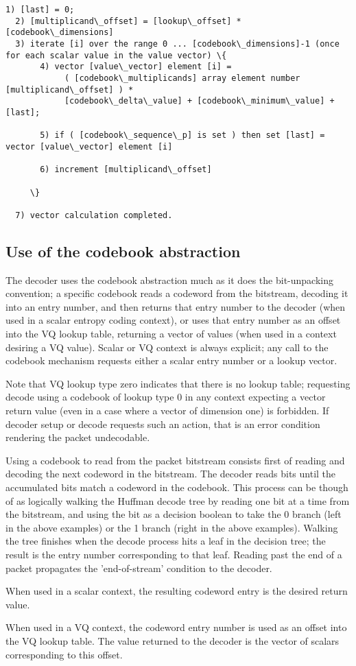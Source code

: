 \begin{Verbatim}[commandchars=\\\{\}]
  1) [last] = 0;
  2) [multiplicand\_offset] = [lookup\_offset] * [codebook\_dimensions]
  3) iterate [i] over the range 0 ... [codebook\_dimensions]-1 (once for each scalar value in the value vector) \{
       4) vector [value\_vector] element [i] =
            ( [codebook\_multiplicands] array element number [multiplicand\_offset] ) *
            [codebook\_delta\_value] + [codebook\_minimum\_value] + [last];

       5) if ( [codebook\_sequence\_p] is set ) then set [last] = vector [value\_vector] element [i]

       6) increment [multiplicand\_offset]

     \}

  7) vector calculation completed.
\end{Verbatim}









\subsection{Use of the codebook abstraction}

The decoder uses the codebook abstraction much as it does the
bit-unpacking convention; a specific codebook reads a
codeword from the bitstream, decoding it into an entry number, and then
returns that entry number to the decoder (when used in a scalar
entropy coding context), or uses that entry number as an offset into
the VQ lookup table, returning a vector of values (when used in a context
desiring a VQ value). Scalar or VQ context is always explicit; any call
to the codebook mechanism requests either a scalar entry number or a
lookup vector.

Note that VQ lookup type zero indicates that there is no lookup table;
requesting decode using a codebook of lookup type 0 in any context
expecting a vector return value (even in a case where a vector of
dimension one) is forbidden.  If decoder setup or decode requests such
an action, that is an error condition rendering the packet
undecodable.

Using a codebook to read from the packet bitstream consists first of
reading and decoding the next codeword in the bitstream. The decoder
reads bits until the accumulated bits match a codeword in the
codebook.  This process can be though of as logically walking the
Huffman decode tree by reading one bit at a time from the bitstream,
and using the bit as a decision boolean to take the 0 branch (left in
the above examples) or the 1 branch (right in the above examples).
Walking the tree finishes when the decode process hits a leaf in the
decision tree; the result is the entry number corresponding to that
leaf.  Reading past the end of a packet propagates the 'end-of-stream'
condition to the decoder.

When used in a scalar context, the resulting codeword entry is the
desired return value.

When used in a VQ context, the codeword entry number is used as an
offset into the VQ lookup table.  The value returned to the decoder is
the vector of scalars corresponding to this offset.
